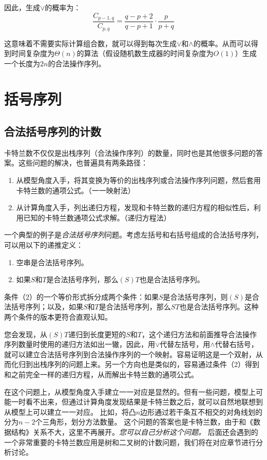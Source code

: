 因此，生成$\lor$的概率为：
$$
\frac{C_{p-1,q}}{C_{p,q}}=\frac{q-p+2}{q-p+1}\cdot \frac{p}{p+q}
$$

这意味着不需要实际计算组合数，就可以得到每次生成$\lor$和$\land$的概率。从而可以得到时间复杂度为$\Theta(n)$的算法（假设随机数生成器的时间复杂度为$O(1)$）生成一个长度为$2n$的合法操作序列。

\section{括号序列}

\subsection{合法括号序列的计数}

卡特兰数不仅仅是出栈序列（合法操作序列）的数量，同时也是其他很多问题的答案。这些问题的解决，也普遍具有两条路径：

\begin{enumerate}
    \item 从模型角度入手，将其变换为等价的出栈序列或合法操作序列问题，然后套用卡特兰数的通项公式。（一一映射法）
    \item 从计算角度入手，列出递归方程，发现和卡特兰数的递归方程的相似性后，利用已知的卡特兰数通项公式求解。（递归方程法）
\end{enumerate}

一个典型的例子是\textit{合法括号序列}问题。考虑左括号和右括号组成的合法括号序列，可以用以下的递推定义：
\begin{enumerate}
    \item 空串是合法括号序列。
    \item 如果$S$和$T$是合法括号序列，那么$(S)T$也是合法括号序列。
\end{enumerate}

条件（2）的一个等价形式拆分成两个条件：如果$S$是合法括号序列，则$(S)$是合法括号序列；以及，如果$S$和$T$是合法括号序列，那么$ST$也是合法括号序列。这种两个条件的版本更符合直观认知。

您会发现，从$(S)T$递归到长度更短的$S$和$T$，这个递归方法和前面推导合法操作序列数量时使用的递归方法如出一辙，因此，用$\lor$代替左括号，用$\land$代替右括号，就可以建立合法括号序列到合法操作序列的一个映射。容易证明这是一个双射，从而化归到出栈序列的问题上来。另一个方向也是类似的，容易通过条件（2）得到和之前完全一样的递归方程，从而解出卡特兰数的通项公式。

在这个问题上，从模型角度入手建立一一对应是显然的。但有一些问题，模型上可能一时看不出来，但通过计算角度发现结果是卡特兰数之后，就可以自然地联想到从模型上可以建立一一对应。
比如，将凸$n$边形通过若干条互不相交的对角线划的分为$n-2$个三角形，划分方法数量。
这个问题的答案也是卡特兰数，由于和《数据结构》关系不大，这里不再展开。\textit{您可以自己分析这个问题。}
后面还会遇到的一个非常重要的卡特兰数应用是树和二叉树的计数问题，我们将在对应章节进行分析讨论。

